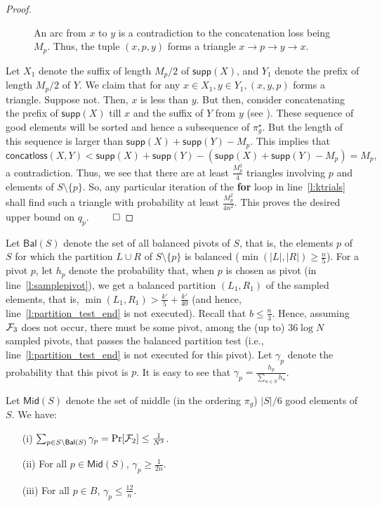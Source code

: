 \documentclass[11pt]{llncs}
\newcommand{\Mid}{{\mathsf{Mid}}}
\newcommand{\Bal}{{\mathsf{Bal}}}
\newcommand{\supp}{{\textsf{supp}}}
\newcommand{\conloss}{{\textsf{concatloss}}}
\begin{document}
\begin{proof}
\begin{figure}[h]
\begin{tikzpicture}
\end{tikzpicture}

    \caption{An arc from $x$ to $y$ is a contradiction to the concatenation loss being $M_p$. Thus, the tuple $(x,p,y)$ forms a triangle $x\rightarrow p \rightarrow y  \rightarrow x$.} 
    \label{fig:concat_loss}
    \end{figure}
    Let $X_1$ denote the suffix of length $M_p / 2$ of $\supp(X)$, and $Y_1$ denote the prefix of length $M_p / 2$ of $Y$. We claim that for any $x \in X_1, y \in Y_1, (x,y,p)$ forms a triangle. Suppose not. Then, $x$ is less than $y$. But then, consider concatenating the prefix of $\supp(X)$ till $x$ and the suffix of $Y$ from $y$ (see ). These sequence of good elements will be sorted and hence a subsequence of $\pi^\star_g$. But the length of this sequence is larger than  $\supp(X) + \supp(Y) - M_p. $ This implies that $\conloss(X,Y) < \supp(X) + \supp(Y) - (\supp(X) + \supp(Y)  - M_p) = M_p,$ a contradiction. Thus, we see that there are at least $\frac{M_p^2}{4}$ triangles involving $p$ and elements of $S \setminus \{p\}$. So, any particular iteration of the {\bf for} loop in line~\ref{l:ktrials} shall find such a triangle with probability at least $\frac{M_p^2}{4n^2}$. This proves the desired upper bound on $q_p$.
    $\qed$
\end{proof}

 Let $\Bal(S)$ denote the set of all balanced pivots of $S$, that is, the elements $p$ of $S$ for which the partition $L \cup R$ of $S \setminus \{p\}$ is balanced ($\min(|L|, |R|) \geq \frac{n}{5}$). For a pivot $p$, let $h_p$ denote the probability that, when $p$ is chosen as pivot (in line~\ref{l:samplepivot}),  we get a balanced partition $(L_1, R_1)$ of the sampled elements, that is, $\min(L_1, R_1) > \frac{k'}{5} + \frac{k'}{40}$ (and hence, line~\ref{l:partition_test_end} is not executed).  Recall that $b \leq \frac{n}{3}$. Hence, assuming ${\cal F}_3$ does not occur, there must be some pivot, among the (up to) $36 \log N$ sampled pivots, that passes the balanced partition test (i.e., line~\ref{l:partition_test_end} is not executed for this pivot). Let $\gamma_p$ denote the probability that this pivot is $p$. It is easy to see that $\gamma_p = \frac{h_p}{\sum_{u \in S} h_u}$.

\begin{lemma}
\label{lem:gamma_bound}
    Let $\Mid(S)$ denote the set of middle (in the ordering $\pi_g$) $|S|/6$ good elements of $S$. We have:
    \begin{itemize}
        \item[(i)] $\sum_{p \in S \setminus \Bal(S)} \gamma_p = \Pr[{\cal F}_2] \leq \frac{1}{N^3}$.
        \item[(ii)] For all $p \in \Mid(S)$, $\gamma_p \geq \frac{1}{2n} $.
        \item[(iii)] For all $p \in B$, $\gamma_p \leq \frac{12}{n}$.
    \end{itemize}
\end{lemma}
\end{document}
